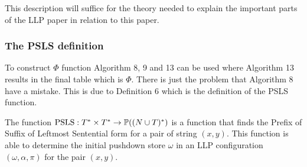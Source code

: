 This description will suffice for the theory needed to explain the important parts of the LLP paper \cite{Vagner2007} in relation to this paper.

\subsubsection{The PSLS definition}
To construct $\Phi$ function Algorithm 8, 9 and 13 \cite[13, 15]{Vagner2007} can be used where Algorithm 13 results in the final table which is $\Phi$. There is just the problem that Algorithm 8 have a mistake. This is due to Definition 6 \cite[12]{Vagner2007} which is the definition of the PSLS function.

The function $\text{PSLS}: T^* \times T^* \to \mathbb{P}((N \cup T)^*)$ is a function that finds the Prefix of Suffix of Leftmost Sentential form for a pair of string $(x, y)$. This function is able to determine the initial pushdown store $\omega$ in an LLP configuration $(\omega, \alpha, \pi)$ for the pair $(x, y)$.

